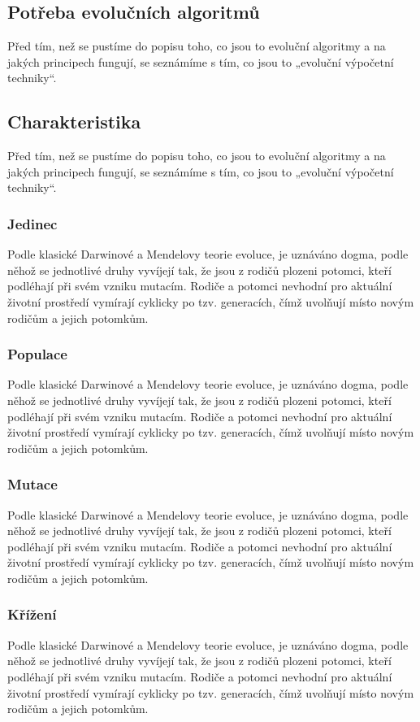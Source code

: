 \documentclass[bc,male,java,dept460]{diploma}		%
\begin{document}
\subsection{Potřeba evolučních algoritmů}
Před tím, než se pustíme do popisu toho, co jsou to evoluční algoritmy a na jakých principech fungují, se seznámíme s tím, co jsou to „evoluční výpočetní techniky“.

\subsection{Charakteristika}
Před tím, než se pustíme do popisu toho, co jsou to evoluční algoritmy a na jakých principech fungují, se seznámíme s tím, co jsou to „evoluční výpočetní techniky“.

\subsubsection{Jedinec}
Podle klasické Darwinové a Mendelovy teorie evoluce, je uznáváno dogma, podle něhož se jednotlivé druhy vyvíjejí tak, že jsou z rodičů plozeni potomci, kteří podléhají při svém vzniku mutacím. Rodiče a potomci nevhodní pro aktuální životní prostředí vymírají cyklicky po tzv. generacích, čímž uvolňují místo novým rodičům a jejich potomkům.

\subsubsection{Populace}
Podle klasické Darwinové a Mendelovy teorie evoluce, je uznáváno dogma, podle něhož se jednotlivé druhy vyvíjejí tak, že jsou z rodičů plozeni potomci, kteří podléhají při svém vzniku mutacím. Rodiče a potomci nevhodní pro aktuální životní prostředí vymírají cyklicky po tzv. generacích, čímž uvolňují místo novým rodičům a jejich potomkům.

\subsubsection{Mutace}
Podle klasické Darwinové a Mendelovy teorie evoluce, je uznáváno dogma, podle něhož se jednotlivé druhy vyvíjejí tak, že jsou z rodičů plozeni potomci, kteří podléhají při svém vzniku mutacím. Rodiče a potomci nevhodní pro aktuální životní prostředí vymírají cyklicky po tzv. generacích, čímž uvolňují místo novým rodičům a jejich potomkům.

\subsubsection{Křížení}
Podle klasické Darwinové a Mendelovy teorie evoluce, je uznáváno dogma, podle něhož se jednotlivé druhy vyvíjejí tak, že jsou z rodičů plozeni potomci, kteří podléhají při svém vzniku mutacím. Rodiče a potomci nevhodní pro aktuální životní prostředí vymírají cyklicky po tzv. generacích, čímž uvolňují místo novým rodičům a jejich potomkům.
\end{document}
